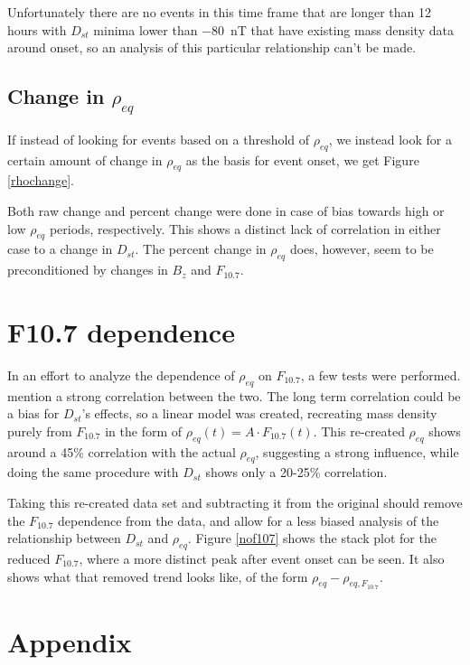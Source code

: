 \documentclass[10pt,twocolumn]{article}
\begin{document}
Unfortunately there are no events in this time frame that are longer than 12 hours with $D_{st}$ minima lower than $-80$~nT that have existing mass density data around onset, so an analysis of this particular relationship can't be made.

\subsection{Change in $\rho_{eq}$}
If instead of looking for events based on a threshold of $\rho_{eq}$, we instead look for a certain amount of change in $\rho_{eq}$ as the basis for event onset, we get Figure \ref{rhochange}.

Both raw change and percent change were done in case of bias towards high or low $\rho_{eq}$ periods, respectively. This shows a distinct lack of correlation in either case to a change in $D_{st}$. The percent change in $\rho_{eq}$ does, however, seem to be preconditioned by changes in $B_z$ and $F_{10.7}$.

\section{F10.7 dependence}
In an effort to analyze the dependence of $\rho_{eq}$ on $F_{10.7}$, a few tests were performed. \cite{Takahashi2010} mention a strong correlation between the two. The long term correlation could be a bias for $D_{st}$'s effects, so a linear model was created, recreating mass density purely from $F_{10.7}$ in the form of $\rho_{eq}(t)=A\cdot F_{10.7}(t)$. This re-created $\rho_{eq}$ shows around a 45\% correlation with the actual $\rho_{eq}$, suggesting a strong influence, while doing the same procedure with $D_{st}$ shows only a 20-25\% correlation. 

Taking this re-created data set and subtracting it from the original should remove the $F_{10.7}$ dependence from the data, and allow for a less biased analysis of the relationship between $D_{st}$ and $\rho_{eq}$. Figure \ref{nof107} shows the stack plot for the reduced $F_{10.7}$, where a more distinct peak after event onset can be seen. It also shows what that removed trend looks like, of the form $\rho_{eq}-\rho_{eq,F_{10.7}}$.

\section{Appendix}
\end{document}
